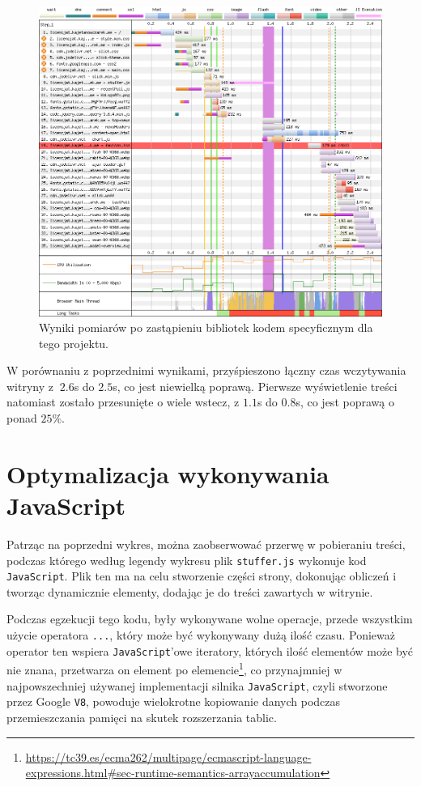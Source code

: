 \documentclass[licencjacka]{pracadypl}
\begin{document}
\begin{figure}[H]
  \centering
  \includegraphics[width=\linewidth]{images/waterfall-after-jsreduction.png}
  \caption{Wyniki pomiarów po zastąpieniu bibliotek kodem specyficznym dla tego projektu.}
  \label{fig:waterfall-after-jsreduction}
\end{figure}

W porównaniu z poprzednimi wynikami, przyśpieszono łączny czas wczytywania witryny z $~2.6$s do $2.5$s, co jest niewielką poprawą. Pierwsze wyświetlenie treści natomiast zostało przesunięte o wiele wstecz, z $1.1$s do $0.8$s, co jest poprawą o ponad $25\%$.

\section{Optymalizacja wykonywania JavaScript}

Patrząc na poprzedni wykres, można zaobserwować przerwę w pobieraniu treści, podczas którego według legendy wykresu plik \texttt{stuffer.js} wykonuje kod \texttt{JavaScript}. Plik ten ma na celu stworzenie części strony, dokonując obliczeń i tworząc dynamicznie elementy, dodając je do treści zawartych w witrynie.

Podczas egzekucji tego kodu, były wykonywane wolne operacje, przede wszystkim użycie operatora \texttt{...}, który może być wykonywany dużą ilość czasu. Ponieważ operator ten wspiera \texttt{JavaScript}'owe iteratory, których ilość elementów może być nie znana, przetwarza on element po elemencie\footnote{\url{https://tc39.es/ecma262/multipage/ecmascript-language-expressions.html\#sec-runtime-semantics-arrayaccumulation}}, co przynajmniej w najpowszechniej używanej implementacji silnika \texttt{JavaScript}, czyli stworzone przez Google \texttt{V8}, powoduje wielokrotne kopiowanie danych podczas przemieszczania pamięci na skutek rozszerzania tablic.
\end{document}
